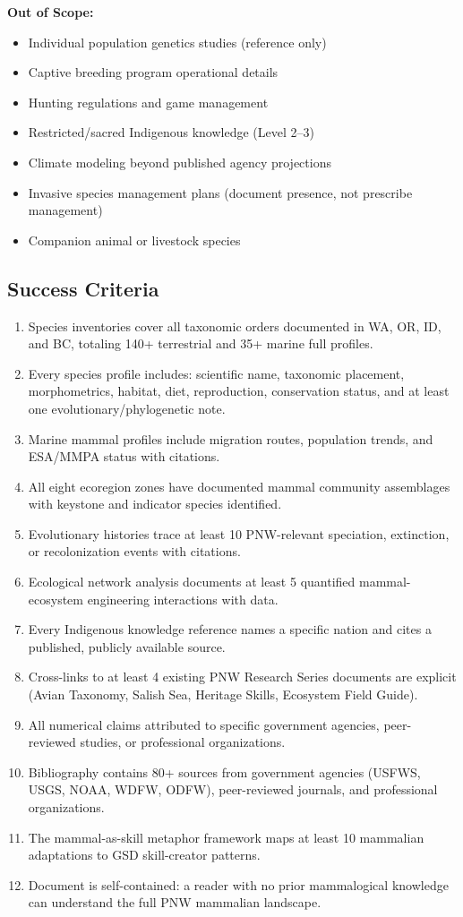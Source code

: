 \documentclass[11pt,letterpaper]{article}
\begin{document}
\textbf{Out of Scope:}
\begin{itemize}[leftmargin=2em]
\item Individual population genetics studies (reference only)
\item Captive breeding program operational details
\item Hunting regulations and game management
\item Restricted/sacred Indigenous knowledge (Level 2--3)
\item Climate modeling beyond published agency projections
\item Invasive species management plans (document presence, not prescribe management)
\item Companion animal or livestock species
\end{itemize}

\subsection{Success Criteria}

\begin{enumerate}[leftmargin=2em]
\item Species inventories cover all taxonomic orders documented in WA, OR, ID, and BC, totaling 140+ terrestrial and 35+ marine full profiles.
\item Every species profile includes: scientific name, taxonomic placement, morphometrics, habitat, diet, reproduction, conservation status, and at least one evolutionary/phylogenetic note.
\item Marine mammal profiles include migration routes, population trends, and ESA/MMPA status with citations.
\item All eight ecoregion zones have documented mammal community assemblages with keystone and indicator species identified.
\item Evolutionary histories trace at least 10 PNW-relevant speciation, extinction, or recolonization events with citations.
\item Ecological network analysis documents at least 5 quantified mammal-ecosystem engineering interactions with data.
\item Every Indigenous knowledge reference names a specific nation and cites a published, publicly available source.
\item Cross-links to at least 4 existing PNW Research Series documents are explicit (Avian Taxonomy, Salish Sea, Heritage Skills, Ecosystem Field Guide).
\item All numerical claims attributed to specific government agencies, peer-reviewed studies, or professional organizations.
\item Bibliography contains 80+ sources from government agencies (USFWS, USGS, NOAA, WDFW, ODFW), peer-reviewed journals, and professional organizations.
\item The mammal-as-skill metaphor framework maps at least 10 mammalian adaptations to GSD skill-creator patterns.
\item Document is self-contained: a reader with no prior mammalogical knowledge can understand the full PNW mammalian landscape.
\end{enumerate}
\end{document}
